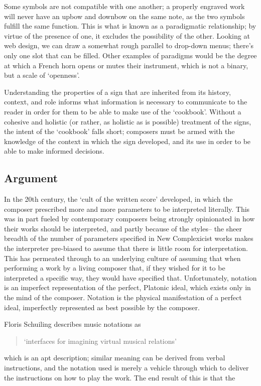 Some symbols are not compatible with one another; a properly engraved work will never have an upbow and downbow on the same note, as the two symbols fulfill the same function.
This is what is known as a paradigmatic relationship; by virtue of the presence of one, it excludes the possibility of the other.
Looking at web design, we can draw a somewhat rough parallel to drop-down menus; there's only one slot that can be filled.
Other examples of paradigms would be the degree at which a French horn opens or mutes their instrument, which is not a binary, but a scale of `openness'.

Understanding the properties of a sign that are inherited from its history, context, and role informs what information is necessary to communicate to the reader in order for them to be able to make use of the `cookbook'.
Without a cohesive and holistic (or rather, as holistic as is possible) treatment of the signs, the intent of the `cookbook' falls short; composers must be armed with the knowledge of the context in which the sign developed, and its use in order to be able to make informed decisions.

\subsection{Argument}
In the 20th century, the `cult of the written score' developed, in which the composer prescribed more and more parameters to be interpreted literally.\autocite[]{citation very much needed}
This was in part fueled by contemporary composers being strongly opinionated in how their works should be interpreted, and partly because of the styles-- the sheer breadth of the number of parameters specified in New Complexicist works makes the interpreter pre-biased to assume that there is little room for interpretation.
This has permeated through to an underlying culture of assuming that when performing a work by a living composer that, if they wished for it to be interpreted a specific way, they would have specified that.
Unfortunately, notation is an imperfect representation of the perfect, Platonic ideal, which exists only in the mind of the composer. 
Notation is the physical manifestation of a perfect ideal, imperfectly represented as best possible by the composer.

Floris Schuiling describes music notations as \begin{quotation}
`interfaces for imagining virtual musical relations'
\end{quotation}
which is an apt description; similar meaning can be derived from verbal instructions, and the notation used is merely a vehicle through which to deliver the instructions on how to play the work.
The end result of this is that the 

